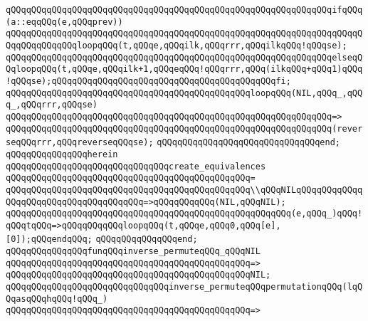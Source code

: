 \verb|qQQqqQQqqQQqqQQqqQQqqQQqqQQqqQQqqQQqqQQqqQQqqQQqqQQqqQQqqQQqqQQqifqQQq(a::eqqQQq(e,qQQqprev))|\newline
\verb|qQQqqQQqqQQqqQQqqQQqqQQqqQQqqQQqqQQqqQQqqQQqqQQqqQQqqQQqqQQqqQQqqQQqqQQqqQQqqQQqqQQqloopqQQq(t,qQQqe,qQQqilk,qQQqrrr,qQQqilkqQQq!qQQqse);|\newline
\verb|qQQqqQQqqQQqqQQqqQQqqQQqqQQqqQQqqQQqqQQqqQQqqQQqqQQqqQQqqQQqqQQqelseqQQqloopqQQq(t,qQQqe,qQQqilk+1,qQQqeqQQq!qQQqrrr,qQQq(ilkqQQq+qQQq1)qQQq!qQQqse);qQQqqQQqqQQqqQQqqQQqqQQqqQQqqQQqqQQqqQQqqQQqfi;|\newline
\newline
\verb|qQQqqQQqqQQqqQQqqQQqqQQqqQQqqQQqqQQqqQQqqQQqqQQqloopqQQq(NIL,qQQq_,qQQq_,qQQqrrr,qQQqse)|\newline
\verb|qQQqqQQqqQQqqQQqqQQqqQQqqQQqqQQqqQQqqQQqqQQqqQQqqQQqqQQqqQQqqQQq=>|\newline
\verb|qQQqqQQqqQQqqQQqqQQqqQQqqQQqqQQqqQQqqQQqqQQqqQQqqQQqqQQqqQQqqQQq(reverseqQQqrrr,qQQqreverseqQQqse);|\newline
\verb|qQQqqQQqqQQqqQQqqQQqqQQqqQQqqQQqend;|\newline
\verb|qQQqqQQqqQQqqQQqherein|\newline
\verb|qQQqqQQqqQQqqQQqqQQqqQQqqQQqqQQqcreate_equivalences|\newline
\verb|qQQqqQQqqQQqqQQqqQQqqQQqqQQqqQQqqQQqqQQqqQQqqQQq=|\newline
\verb|qQQqqQQqqQQqqQQqqQQqqQQqqQQqqQQqqQQqqQQqqQQqqQQq\\qQQqNILqQQqqQQqqQQqqQQqqQQqqQQqqQQqqQQqqQQqqQQq=>qQQqqQQqqQQq(NIL,qQQqNIL);|\newline
\verb|qQQqqQQqqQQqqQQqqQQqqQQqqQQqqQQqqQQqqQQqqQQqqQQqqQQqqQQq(e,qQQq_)qQQq!qQQqtqQQq=>qQQqqQQqqQQqloopqQQq(t,qQQqe,qQQq0,qQQq[e],[0]);qQQqendqQQq;|\newline
\verb|qQQqqQQqqQQqqQQqend;|\newline
\newline
\verb|qQQqqQQqqQQqqQQqfunqQQqinverse_permuteqQQq_qQQqNIL|\newline
\verb|qQQqqQQqqQQqqQQqqQQqqQQqqQQqqQQqqQQqqQQqqQQqqQQq=>|\newline
\verb|qQQqqQQqqQQqqQQqqQQqqQQqqQQqqQQqqQQqqQQqqQQqqQQqNIL;|\newline
\newline
\verb|qQQqqQQqqQQqqQQqqQQqqQQqqQQqqQQqinverse_permuteqQQqpermutationqQQq(lqQQqasqQQqhqQQq!qQQq_)|\newline
\verb|qQQqqQQqqQQqqQQqqQQqqQQqqQQqqQQqqQQqqQQqqQQqqQQq=>|\newline
